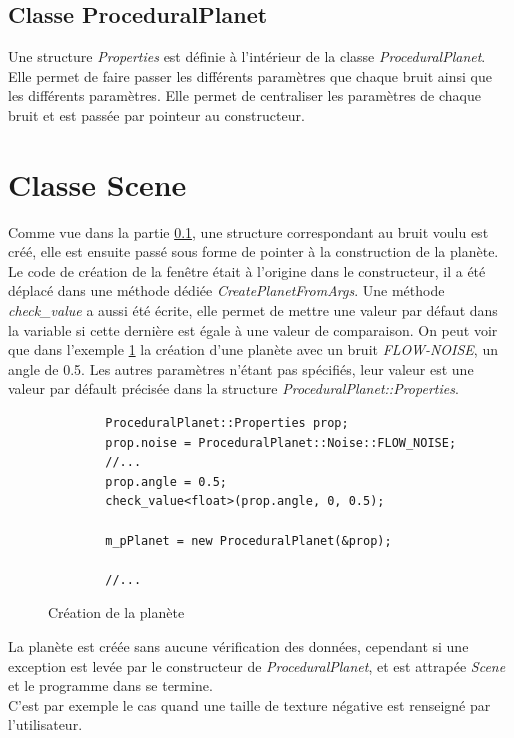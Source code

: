   \subsection{Classe ProceduralPlanet}
    \label{sec::ProceduralPlanet}
  Une structure \textit{Properties} est définie à l'intérieur de la classe \textit{ProceduralPlanet}. Elle permet de faire passer les différents paramètres que chaque bruit ainsi que les différents paramètres. 
  Elle permet de centraliser les paramètres de chaque bruit et est passée par pointeur au constructeur.
  

  \section{Classe Scene}
  Comme vue dans la partie \ref{sec::ProceduralPlanet}, une structure correspondant au bruit voulu est créé,
  elle est ensuite passé sous forme de pointer à la construction de la planète.\\
  
  Le code de création de la fenêtre était à l'origine dans le constructeur, il a été déplacé dans une méthode dédiée \textit{CreatePlanetFromArgs}. Une méthode \textit{check_value} a aussi été écrite, elle permet de mettre une valeur par défaut dans la variable si cette dernière est égale à une valeur de comparaison. On peut voir que dans l'exemple \ref{fig:code_scene} la création d'une planète avec un bruit \textit{FLOW-NOISE}, un angle de 0.5. Les autres paramètres n'étant pas spécifiés, leur valeur est une valeur par défault précisée dans la structure \textit{ProceduralPlanet::Properties}.
  
  \begin{figure}
    \centering
      \lstset{language=C++}
      \begin{lstlisting}
        ProceduralPlanet::Properties prop;
        prop.noise = ProceduralPlanet::Noise::FLOW_NOISE;
        //...
        prop.angle = 0.5;
        check_value<float>(prop.angle, 0, 0.5);
        
        m_pPlanet = new ProceduralPlanet(&prop);
            
        //...
      \end{lstlisting}    
      \caption{Création de la planète}
      \label{fig:code_scene}
  \end{figure}
  
  
  La planète est créée sans aucune vérification des données, cependant si une exception est levée par le constructeur de \textit{ProceduralPlanet}, et est attrapée \textit{Scene} et le programme dans se termine.\\
  C'est par exemple le cas quand une taille de texture négative est renseigné par l'utilisateur.
  
